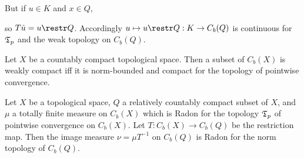 {But if $u\in K$ and $x\in Q$,


\noindent so $T\hat u=u\restr Q$.   Accordingly
$u\mapsto u\restr Q:K\to C_b(Q)$ is continuous for $\frak T_p$ and the weak
topology on $C_b(Q)$.
}%

 Let $X$ be a countably compact topological
space.   Then a subset of $C_b(X)$ is weakly compact iff it is
norm-bounded and compact for the topology of
pointwise convergence.


 Let $X$ be a topological space, $Q$ a
relatively countably
compact subset of $X$, and $\mu$ a totally finite measure on $C_b(X)$ which
is Radon for the topology $\frak T_p$ of pointwise convergence
on $C_b(X)$.   Let
$T:C_b(X)\to C_b(Q)$ be the restriction map.   Then the image measure
$\nu=\mu T^{-1}$ on $C_b(Q)$ is Radon for the norm topology of $C_b(Q)$.

